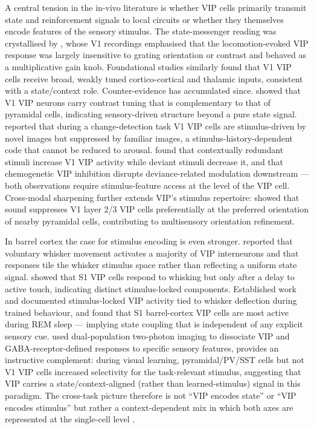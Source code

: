 \documentclass[11pt]{article}
\begin{document}
A central tension in the in-vivo literature is whether VIP cells primarily transmit state and reinforcement signals to local circuits or whether they themselves encode features of the sensory stimulus. The state-messenger reading was crystallised by \citet{Fu2014}, whose V1 recordings emphasised that the locomotion-evoked VIP response was largely insensitive to grating orientation or contrast and behaved as a multiplicative gain knob. Foundational studies \citep{Mesik2015} similarly found that V1 VIP cells receive broad, weakly tuned cortico-cortical and thalamic inputs, consistent with a state/context role. Counter-evidence has accumulated since. \citet{Millman2020} showed that V1 VIP neurons carry contrast tuning that is complementary to that of pyramidal cells, indicating sensory-driven structure beyond a pure state signal. \citet{Garrett2020} reported that during a change-detection task V1 VIP cells are stimulus-driven by novel images but suppressed by familiar images, a stimulus-history-dependent code that cannot be reduced to arousal. \citet{Bastos2023a} found that contextually redundant stimuli increase V1 VIP activity while deviant stimuli decrease it, and that chemogenetic VIP inhibition disrupts deviance-related modulation downstream --- both observations require stimulus-feature access at the level of the VIP cell. Cross-modal sharpening further extends VIP's stimulus repertoire: \citet{Ibrahim2016} showed that sound suppresses V1 layer 2/3 VIP cells preferentially at the preferred orientation of nearby pyramidal cells, contributing to multisensory orientation refinement.

In barrel cortex the case for stimulus encoding is even stronger. \citet{Yu2019} reported that voluntary whisker movement activates a majority of VIP interneurons and that responses tile the whisker stimulus space rather than reflecting a uniform state signal. \citet{Kiritani2023} showed that S1 VIP cells respond to whisking but only after a delay to active touch, indicating distinct stimulus-locked components. Established work \citep{Walker2016} and \citet{Sachidhanandam2016} documented stimulus-locked VIP activity tied to whisker deflection during trained behaviour, and \citet{Brecier2022} found that S1 barrel-cortex VIP cells are most active during REM sleep --- implying state coupling that is independent of any explicit sensory cue. \citet{Lebedeva2025} used dual-population two-photon imaging to dissociate VIP and GABA-receptor-defined responses to specific sensory features, \citet{Khan2018a} provides an instructive complement: during visual learning, pyramidal/PV/SST cells but not V1 VIP cells increased selectivity for the task-relevant stimulus, suggesting that VIP carries a state/context-aligned (rather than learned-stimulus) signal in this paradigm. The cross-task picture therefore is not ``VIP encodes state'' or ``VIP encodes stimulus'' but rather a context-dependent mix in which both axes are represented at the single-cell level \citep{Yu2019, Garrett2020, Bastos2023a, Mesik2015}.
\end{document}
